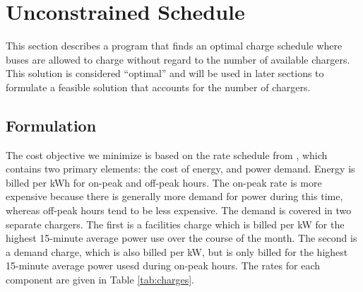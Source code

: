 \section{Unconstrained Schedule \label{sec:unconstrainedSchedule}}
This section describes a program that finds an optimal charge schedule where buses are allowed to charge without regard to the number of available chargers. This solution is considered ``optimal'' and will be used in later sections to formulate a feasible solution that accounts for the number of chargers.
 

 
\subsection{Formulation \label{sec:formulation}} 
The cost objective we minimize is based on the rate schedule from \cite{rocky_mountain_power_rocky_2021}, which contains two primary elements: the cost of energy, and power demand. Energy is billed per kWh for on-peak and off-peak hours. The on-peak rate is more expensive because there is generally more demand for power during this time, whereas off-peak hours tend to be less expensive. The demand is covered in two separate chargers.  The first is a facilities charge which is billed per kW for the highest 15-minute average power use over the course of the month. The second is a demand charge, which is also billed per kW, but is only billed for the highest 15-minute average power usesd during on-peak hours. The rates for each component are given in Table \ref{tab:charges}.  

